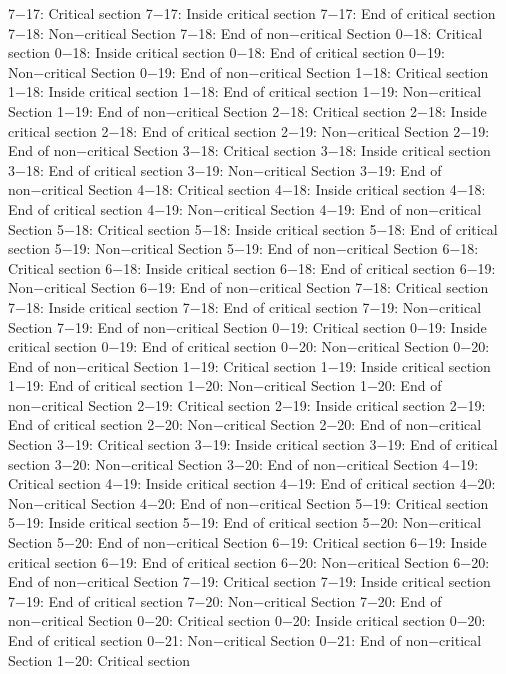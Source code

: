7−17: Critical section
7−17: Inside critical section
7−17: End of critical section
7−18: Non−critical Section
7−18: End of non−critical Section
0−18: Critical section
0−18: Inside critical section
0−18: End of critical section
0−19: Non−critical Section
0−19: End of non−critical Section
1−18: Critical section
1−18: Inside critical section
1−18: End of critical section
1−19: Non−critical Section
1−19: End of non−critical Section
2−18: Critical section
2−18: Inside critical section
2−18: End of critical section
2−19: Non−critical Section
2−19: End of non−critical Section
3−18: Critical section
3−18: Inside critical section
3−18: End of critical section
3−19: Non−critical Section
3−19: End of non−critical Section
4−18: Critical section
4−18: Inside critical section
4−18: End of critical section
4−19: Non−critical Section
4−19: End of non−critical Section
5−18: Critical section
5−18: Inside critical section
5−18: End of critical section
5−19: Non−critical Section
5−19: End of non−critical Section
6−18: Critical section
6−18: Inside critical section
6−18: End of critical section
6−19: Non−critical Section
6−19: End of non−critical Section
7−18: Critical section
7−18: Inside critical section
7−18: End of critical section
7−19: Non−critical Section
7−19: End of non−critical Section
0−19: Critical section
0−19: Inside critical section
0−19: End of critical section
0−20: Non−critical Section
0−20: End of non−critical Section
1−19: Critical section
1−19: Inside critical section
1−19: End of critical section
1−20: Non−critical Section
1−20: End of non−critical Section
2−19: Critical section
2−19: Inside critical section
2−19: End of critical section
2−20: Non−critical Section
2−20: End of non−critical Section
3−19: Critical section
3−19: Inside critical section
3−19: End of critical section
3−20: Non−critical Section
3−20: End of non−critical Section
4−19: Critical section
4−19: Inside critical section
4−19: End of critical section
4−20: Non−critical Section
4−20: End of non−critical Section
5−19: Critical section
5−19: Inside critical section
5−19: End of critical section
5−20: Non−critical Section
5−20: End of non−critical Section
6−19: Critical section
6−19: Inside critical section
6−19: End of critical section
6−20: Non−critical Section
6−20: End of non−critical Section
7−19: Critical section
7−19: Inside critical section
7−19: End of critical section
7−20: Non−critical Section
7−20: End of non−critical Section
0−20: Critical section
0−20: Inside critical section
0−20: End of critical section
0−21: Non−critical Section
0−21: End of non−critical Section
1−20: Critical section
